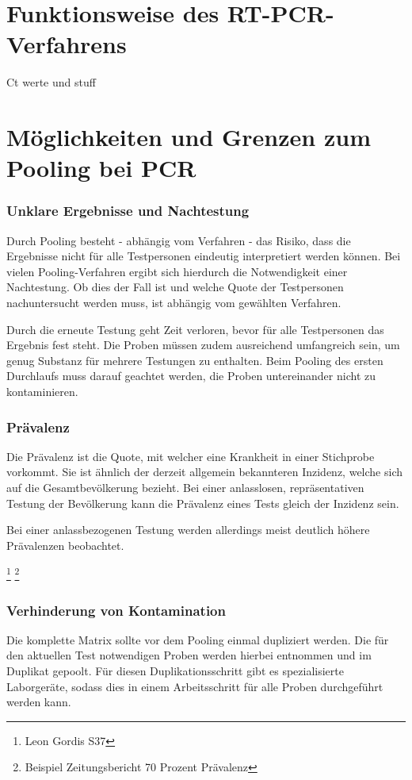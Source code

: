 \section{Funktionsweise des RT-PCR-Verfahrens}
Ct werte und stuff

\cleardoublepage

\section{Möglichkeiten und Grenzen zum Pooling bei PCR}
\subsubsection{Unklare Ergebnisse und Nachtestung}
Durch Pooling besteht - abhängig vom Verfahren - das Risiko, dass die Ergebnisse nicht für alle Testpersonen eindeutig interpretiert werden können.
Bei vielen Pooling-Verfahren ergibt sich hierdurch die Notwendigkeit einer Nachtestung.
Ob dies der Fall ist und welche Quote der Testpersonen nachuntersucht werden muss, ist abhängig vom gewählten Verfahren.

Durch die erneute Testung geht Zeit verloren, bevor für alle Testpersonen das Ergebnis fest steht.
Die Proben müssen zudem ausreichend umfangreich sein, um genug Substanz für mehrere Testungen zu enthalten.
Beim Pooling des ersten Durchlaufs muss darauf geachtet werden, die Proben untereinander nicht zu kontaminieren.

\subsubsection{Prävalenz}
Die Prävalenz ist die Quote, mit welcher eine Krankheit in einer Stichprobe vorkommt.
Sie ist ähnlich der derzeit allgemein bekannteren Inzidenz, welche sich auf die Gesamtbevölkerung bezieht.
Bei einer anlasslosen, repräsentativen Testung der Bevölkerung kann die Prävalenz eines Tests gleich der Inzidenz sein.

Bei einer anlassbezogenen Testung werden allerdings meist deutlich höhere Prävalenzen beobachtet.

\footnote{Leon Gordis S37}
\footnote{Beispiel Zeitungsbericht 70 Prozent Prävalenz}


\subsubsection{Verhinderung von Kontamination}
Die komplette Matrix sollte vor dem Pooling einmal dupliziert werden. 
Die für den aktuellen Test notwendigen Proben werden hierbei entnommen und im Duplikat gepoolt.
Für diesen Duplikationsschritt gibt es spezialisierte Laborgeräte, sodass dies in einem Arbeitsschritt für alle Proben durchgeführt werden kann.

